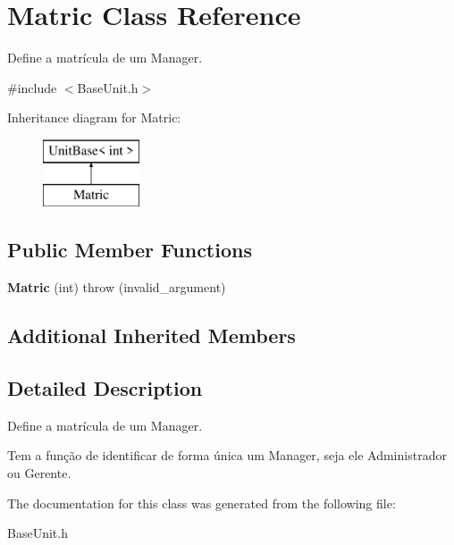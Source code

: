 \hypertarget{classMatric}{\section{Matric Class Reference}
\label{classMatric}
}


Define a matrícula de um Manager.  




{\ttfamily \#include $<$Base\-Unit.\-h$>$}

Inheritance diagram for Matric\-:\begin{figure}[H]
\begin{center}
\leavevmode
\includegraphics[height=2.000000cm]{classMatric}
\end{center}
\end{figure}
\subsection*{Public Member Functions}
\begin{DoxyCompactItemize}
\item 
\hypertarget{classMatric_a0f74486adf618928641729a73ee76286}{{\bfseries Matric} (int)  throw (invalid\-\_\-argument)}\label{classMatric_a0f74486adf618928641729a73ee76286}

\end{DoxyCompactItemize}
\subsection*{Additional Inherited Members}


\subsection{Detailed Description}
Define a matrícula de um Manager. 

Tem a função de identificar de forma única um Manager, seja ele Administrador ou Gerente. 

The documentation for this class was generated from the following file\-:\begin{DoxyCompactItemize}
\item 
Base\-Unit.\-h\end{DoxyCompactItemize}
